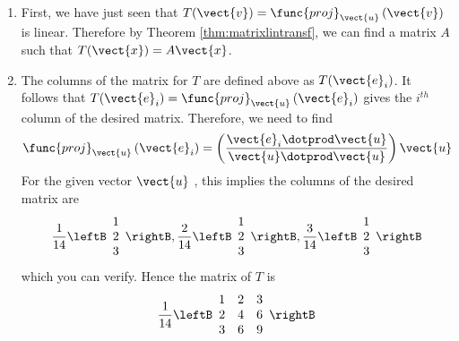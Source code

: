 \begin{solution}
\begin{enumerate}
\item
First, we have just seen that $T (\vect{v}) = \func{proj}_{\vect{u}}\left( \vect{v}\right)$ is linear. Therefore by Theorem \ref{thm:matrixlintransf}, we can find a matrix $A$ such that $T(\vect{x}) = A\vect{x}$. 

\item
The columns of the matrix for $T$ are defined above as $T(\vect{e}_{i})$. 
It follows that $T(\vect{e}_{i}) = \func{proj}
_{\vect{u}}\left( \vect{e}_{i}\right) $ gives the $i^{th}$ column of the
desired matrix. Therefore, we need to find
\begin{equation*}
\func{proj}_{\vect{u}}\left( \vect{e}_{i}\right) = \left( \vspace{0.05in}
\frac{\vect{e}_{i}\dotprod \vect{u}}{\vect{u}\dotprod \vect{u}}\right)
\vect{u}
\end{equation*}
For the given vector $\vect{u}$ , this implies the columns of the desired
matrix are
\begin{equation*}
\vspace{0.05in}\frac{1}{14}\leftB
\begin{array}{r}
1 \\
2 \\
3
\end{array}
\rightB ,\vspace{0.05in}\frac{2}{14}\leftB
\begin{array}{r}
1 \\
2 \\
3
\end{array}
\rightB ,\vspace{0.05in}\frac{3}{14}\leftB
\begin{array}{r}
1 \\
2 \\
3
\end{array}
\rightB 
\end{equation*}
which you can verify.
Hence the matrix of $T$ is
\begin{equation*}
\vspace{0.05in}\frac{1}{14}\leftB
\begin{array}{rrr}
1 & 2 & 3 \\
2 & 4 & 6 \\
3 & 6 & 9
\end{array}
\rightB 
\end{equation*}
\end{enumerate}
\end{solution}
